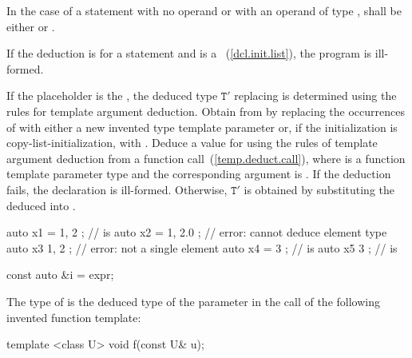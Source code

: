 In the case of a  statement with no operand
or with an operand of type ,
 shall be either
 or \cv{} .

\pnum
If the deduction is for a  statement
and  is a ~(\ref{dcl.init.list}),
the program is ill-formed.

\pnum
If the placeholder is the  , the
deduced type
$\mathtt{T}'$ replacing 
is determined using the rules for template argument deduction.
Obtain  from
 by replacing the occurrences of  with either a new
invented type template parameter  or,
if the initialization is copy-list-initialization, with
. Deduce a value for  using the rules
of template argument deduction from a function call~(\ref{temp.deduct.call}),
where  is a
function template parameter type and
the corresponding argument is .
If the deduction fails, the declaration is ill-formed.
Otherwise, $\mathtt{T}'$ is obtained by
substituting the deduced  into .
\begin{example}
\begin{codeblock}
auto x1 = { 1, 2 };         //  is 
auto x2 = { 1, 2.0 };       // error: cannot deduce element type
auto x3{ 1, 2 };            // error: not a single element
auto x4 = { 3 };            //  is 
auto x5{ 3 };               //  is 
\end{codeblock}
\end{example}

\begin{example}
\begin{codeblock}
const auto &i = expr;
\end{codeblock}

The type of  is the deduced type of the parameter  in
the call  of the following invented function template:

\begin{codeblock}
template <class U> void f(const U& u);
\end{codeblock}
\end{example}

